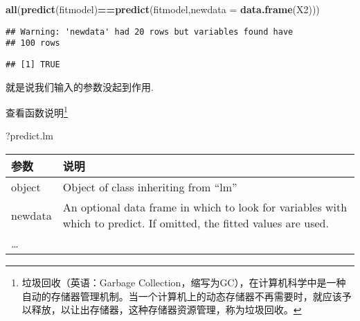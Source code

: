 \documentclass[]{ctexbook}
\newenvironment{Shaded}{\begin{snugshade}}{\end{snugshade}}
\newcommand{\DataTypeTok}[1]{\textcolor[rgb]{0.13,0.29,0.53}{#1}}
\newcommand{\KeywordTok}[1]{\textcolor[rgb]{0.13,0.29,0.53}{\textbf{#1}}}
\newcommand{\NormalTok}[1]{#1}
\newcommand{\OperatorTok}[1]{\textcolor[rgb]{0.81,0.36,0.00}{\textbf{#1}}}
\begin{document}
\begin{Shaded}
\begin{Highlighting}[]
\KeywordTok{all}\NormalTok{(}\KeywordTok{predict}\NormalTok{(fitmodel)}\OperatorTok{==}\KeywordTok{predict}\NormalTok{(fitmodel,}\DataTypeTok{newdata =} \KeywordTok{data.frame}\NormalTok{(X2)))}
\end{Highlighting}
\end{Shaded}

\begin{verbatim}
## Warning: 'newdata' had 20 rows but variables found have
## 100 rows
\end{verbatim}

\begin{verbatim}
## [1] TRUE
\end{verbatim}

就是说我们输入的参数没起到作用.

查看函数说明\footnote{垃圾回收（英语：Garbage Collection，缩写为GC），在计算机科学中是一种自动的存储器管理机制。当一个计算机上的动态存储器不再需要时，就应该予以释放，以让出存储器，这种存储器资源管理，称为垃圾回收。}

\begin{Shaded}
\begin{Highlighting}[]
\NormalTok{?predict.lm}
\end{Highlighting}
\end{Shaded}

\begin{longtable}[]{@{}ll@{}}
\toprule
\begin{minipage}[b]{0.13\columnwidth}\raggedright
参数\strut
\end{minipage} & \begin{minipage}[b]{0.81\columnwidth}\raggedright
说明\strut
\end{minipage}\tabularnewline
\midrule
\endhead
\begin{minipage}[t]{0.13\columnwidth}\raggedright
object\strut
\end{minipage} & \begin{minipage}[t]{0.81\columnwidth}\raggedright
Object of class inheriting from ``lm''\strut
\end{minipage}\tabularnewline
\begin{minipage}[t]{0.13\columnwidth}\raggedright
newdata\strut
\end{minipage} & \begin{minipage}[t]{0.81\columnwidth}\raggedright
An optional data frame in which to look for variables with which to predict. If omitted, the fitted values are used.\strut
\end{minipage}\tabularnewline
\begin{minipage}[t]{0.13\columnwidth}\raggedright
\ldots{}\strut
\end{minipage} & \begin{minipage}[t]{0.81\columnwidth}\raggedright
\strut
\end{minipage}\tabularnewline
\bottomrule
\end{longtable}
\end{document}
